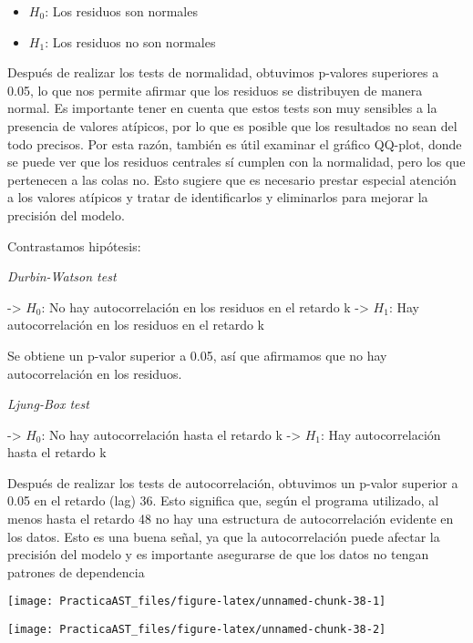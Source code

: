 \documentclass[
]{article}
\providecommand{\tightlist}{%
  \setlength{\itemsep}{0pt}\setlength{\parskip}{0pt}}
\begin{document}
\begin{itemize}
\tightlist
\item
  \(H_0\): Los residuos son normales
\item
  \(H_1\): Los residuos no son normales
\end{itemize}

Después de realizar los tests de normalidad, obtuvimos p-valores
superiores a 0.05, lo que nos permite afirmar que los residuos se
distribuyen de manera normal. Es importante tener en cuenta que estos
tests son muy sensibles a la presencia de valores atípicos, por lo que
es posible que los resultados no sean del todo precisos. Por esta razón,
también es útil examinar el gráfico QQ-plot, donde se puede ver que los
residuos centrales sí cumplen con la normalidad, pero los que pertenecen
a las colas no. Esto sugiere que es necesario prestar especial atención
a los valores atípicos y tratar de identificarlos y eliminarlos para
mejorar la precisión del modelo.

\medskip

Contrastamos hipótesis:

\emph{Durbin-Watson test}

-\textgreater{} \(H_0\): No hay autocorrelación en los residuos en el
retardo k -\textgreater{} \(H_1\): Hay autocorrelación en los residuos
en el retardo k

Se obtiene un p-valor superior a 0.05, así que afirmamos que no hay
autocorrelación en los residuos.

\emph{Ljung-Box test}

-\textgreater{} \(H_0\): No hay autocorrelación hasta el retardo k
-\textgreater{} \(H_1\): Hay autocorrelación hasta el retardo k

Después de realizar los tests de autocorrelación, obtuvimos un p-valor
superior a 0.05 en el retardo (lag) 36. Esto significa que, según el
programa utilizado, al menos hasta el retardo 48 no hay una estructura
de autocorrelación evidente en los datos. Esto es una buena señal, ya
que la autocorrelación puede afectar la precisión del modelo y es
importante asegurarse de que los datos no tengan patrones de dependencia

\medskip

\begin{center}\texttt{[image: PracticaAST\_files/figure-latex/unnamed-chunk-38-1]} \end{center}

\begin{center}\texttt{[image: PracticaAST\_files/figure-latex/unnamed-chunk-38-2]} \end{center}
\end{document}

